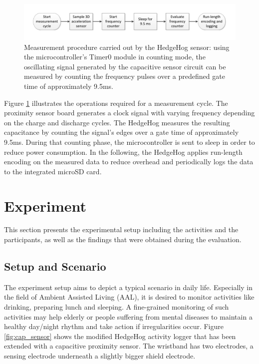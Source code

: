 \documentclass[runningheads,a4paper]{llncs}
\begin{document}
\begin{figure}
	\centering
 		\includegraphics[trim=1cm 1cm 1cm 1cm,clip,width=\textwidth]{Images/pseudocode.pdf}
	\caption{Measurement procedure carried out by the HedgeHog sensor: using the microcontroller's Timer0 module in counting mode, the oscillating signal generated by the capacitive sensor circuit can be measured by counting the frequency pulses over a predefined gate time of approximately 9.5ms.}
	\label{fig:pseudocode}
\end{figure}

Figure \ref{fig:pseudocode} illustrates the operations required for a measurement cycle. The proximity sensor board generates a clock signal with varying frequency depending on the charge and discharge cycles. The HedgeHog measures the resulting capacitance by counting the signal's edges over a gate time of approximately 9.5ms. During that counting phase, the microcontroller is sent to sleep in order to reduce power consumption. In the following, the HedgeHog applies run-length encoding on the measured data to reduce overhead and periodically logs the data to the integrated microSD card.

\section{Experiment}
\label{sect:experiment}

This section presents the experimental setup including the activities and the participants, as well as the findings that were obtained during the evaluation.

\subsection{Setup and Scenario}

The experiment setup aims to depict a typical scenario in daily life. Especially in the field of Ambient Assisted Living (AAL), it is desired to monitor activities like drinking, preparing lunch and sleeping. A fine-grained monitoring of such activities may help elderly or people suffering from mental diseases to maintain a healthy day/night rhythm and take action if irregularities occur. Figure \ref{fig:cap_sensor} shows the modified HedgeHog activity logger that has been extended with a capacitive proximity sensor. The wristband has two electrodes, a sensing electrode underneath a slightly bigger shield electrode. 
\end{document}

